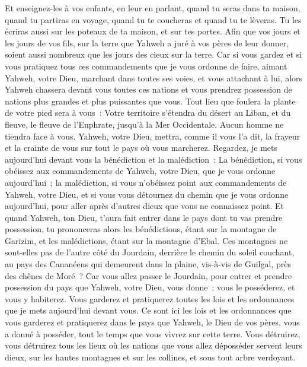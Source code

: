 \begin{multicols}{2}
Et enseignez-les à vos enfants, en leur en parlant, quand tu seras dans ta maison, quand tu partiras en voyage, quand tu te coucheras et quand tu te lèveras.
Tu les écriras aussi sur les poteaux de ta maison, et sur tes portes.
Afin que vos jours et les jours de vos fils, sur la terre que Yahweh a juré à vos pères de leur donner, soient aussi nombreux que les jours des cieux sur la terre.
Car si vous gardez et si vous pratiquez tous ces commandements que je vous ordonne de faire, aimant Yahweh, votre Dieu, marchant dans toutes ses voies, et vous attachant à lui,
alors Yahweh chassera devant vous toutes ces nations et vous prendrez possession de nations plus grandes et plus puissantes que vous.
Tout lieu que foulera la plante de votre pied sera à vous~: Votre territoire s'étendra du désert au Liban, et du fleuve, le fleuve de l'Euphrate, jusqu'à la Mer Occidentale.
Aucun homme ne tiendra face à vous. Yahweh, votre Dieu, mettra, comme il vous l'a dit, la frayeur et la crainte de vous sur tout le pays où vous marcherez.
Regardez, je mets aujourd'hui devant vous la bénédiction et la malédiction~:
La bénédiction, si vous obéissez aux commandements de Yahweh, votre Dieu, que je vous ordonne aujourd'hui~;
la malédiction, si vous n'obéissez point aux commandements de Yahweh, votre Dieu, et si vous vous détournez du chemin que je vous ordonne aujourd'hui, pour aller après d'autres dieux que vous ne connaissez point.
Et quand Yahweh, ton Dieu, t'aura fait entrer dans le pays dont tu vas prendre possession, tu prononceras alors les bénédictions, étant sur la montagne de Garizim, et les malédictions, étant sur la montagne d'Ebal.
Ces montagnes ne sont-elles pas de l'autre côté du Jourdain, derrière le chemin du soleil couchant, au pays des Cananéens qui demeurent dans la plaine, vis-à-vis de Guilgal, près des chênes de Moré~?
Car vous allez passer le Jourdain, pour entrer et prendre possession du pays que Yahweh, votre Dieu, vous donne~; vous le posséderez, et vous y habiterez.
Vous garderez et pratiquerez toutes les lois et les ordonnances que je mets aujourd'hui devant vous.
\VerseOne{}Ce sont ici les lois et les ordonnances que vous garderez et pratiquerez dans le pays que Yahweh, le Dieu de vos pères, vous a donné à posséder, tout le temps que vous vivrez sur cette terre.
Vous détruirez, vous détruirez tous les lieux où les nations que vous allez déposséder servent leurs dieux, sur les hautes montagnes et sur les collines, et sous tout arbre verdoyant.

\end{multicols}
